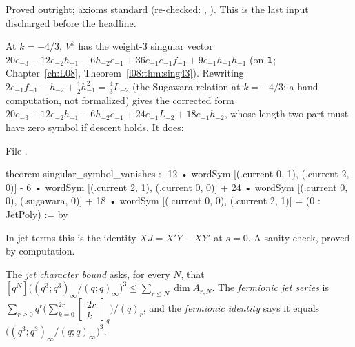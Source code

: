 \begin{status}
Proved outright; axioms standard (re-checked: , ). This is the
last input discharged before the headline.
\end{status}

\begin{example}\label{l28:ex:singular}
At $k=-4/3$, $V^k$ has the weight-3 singular vector
$20e_{-3}-12e_{-2}h_{-1}-6h_{-2}e_{-1}+36e_{-1}e_{-1}f_{-1}+9e_{-1}h_{-1}h_{-1}$ (on $\mathbf 1$; Chapter~\ref{ch:L08}, Theorem~\ref{l08:thm:sing43}).
Rewriting $2e_{-1}f_{-1}-h_{-2}+\tfrac12h_{-1}^2=\tfrac43L_{-2}$ (the Sugawara relation at $k=-4/3$; a hand computation, not formalized) gives the corrected
form $20e_{-3}-12e_{-2}h_{-1}-6h_{-2}e_{-1}+24e_{-1}L_{-2}+18e_{-1}h_{-2}$, whose length-two part must have zero symbol if descent holds. It does:
\par\noindent File .
\begin{leancode}
theorem singular_symbol_vanishes :
    -12 • wordSym [(.current 0, 1), (.current 2, 0)]
      - 6 • wordSym [(.current 2, 1), (.current 0, 0)]
      + 24 • wordSym [(.current 0, 0), (.sugawara, 0)]
      + 18 • wordSym [(.current 0, 0), (.current 2, 1)] = (0 : JetPoly) := by
\end{leancode}
In jet terms this is the identity $XJ=X'Y-XY'$ at $s=0$. A sanity check, proved by computation.
\end{example}

\begin{definition}\label{l28:def:jetbound}
The \emph{jet character bound} asks, for every $N$, that $[q^N]\bigl((q^3;q^3)_\infty/(q;q)_\infty\bigr)^3\le\sum_{r\le N}\dim A_{r,N}$. The \emph{fermionic jet
series} is $\sum_{r\ge0}q^r\bigl(\sum_{k=0}^{2r}\left[\begin{smallmatrix}2r\\k\end{smallmatrix}\right]_q\bigr)/(q)_r$, and the \emph{fermionic identity} says it equals
$\bigl((q^3;q^3)_\infty/(q;q)_\infty\bigr)^3$.
\end{definition}


